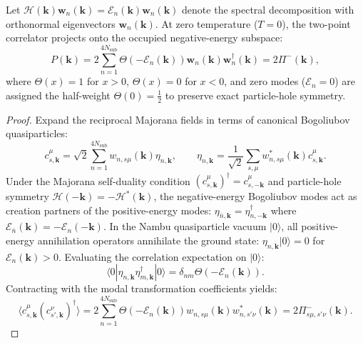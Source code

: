 \begin{theorem}
\label{thm:m1_3_spectral_projector}
Let $\mathcal{H}(\mathbf{k}) \mathbf{w}_n(\mathbf{k}) = \mathcal{E}_n(\mathbf{k}) \mathbf{w}_n(\mathbf{k})$ denote the spectral decomposition with orthonormal eigenvectors $\mathbf{w}_n(\mathbf{k})$. At zero temperature ($T = 0$), the two-point correlator projects onto the occupied negative-energy subspace:
\begin{equation}
\label{eq:m1_3_P_proj}
P(\mathbf{k}) = 2 \sum_{n=1}^{4N_{\mathrm{sub}}} \Theta(-\mathcal{E}_n(\mathbf{k})) \mathbf{w}_n(\mathbf{k}) \mathbf{w}_n^\dagger(\mathbf{k}) = 2 \Pi^-(\mathbf{k}),
\end{equation}
where $\Theta(x) = 1$ for $x > 0$, $\Theta(x) = 0$ for $x < 0$, and zero modes ($\mathcal{E}_n = 0$) are assigned the half-weight $\Theta(0) = \frac{1}{2}$ to preserve exact particle-hole symmetry.
\end{theorem}
\begin{proof}
Expand the reciprocal Majorana fields in terms of canonical Bogoliubov quasiparticles:
\begin{equation}
c_{s, \mathbf{k}}^\mu = \sqrt{2} \sum_{n=1}^{4N_{\mathrm{sub}}} w_{n, s\mu}(\mathbf{k}) \eta_{n, \mathbf{k}}, \qquad \eta_{n, \mathbf{k}} = \frac{1}{\sqrt{2}} \sum_{s, \mu} w_{n, s\mu}^*(\mathbf{k}) c_{s, \mathbf{k}}^\mu.
\end{equation}
Under the Majorana self-duality condition $(c_{s, \mathbf{k}}^\mu)^\dagger = c_{s, -\mathbf{k}}^\mu$ and particle-hole symmetry $\mathcal{H}(-\mathbf{k}) = -\mathcal{H}^*(\mathbf{k})$, the negative-energy Bogoliubov modes act as creation partners of the positive-energy modes: $\eta_{\bar{n}, \mathbf{k}} = \eta_{n, -\mathbf{k}}^\dagger$ where $\mathcal{E}_{\bar{n}}(\mathbf{k}) = -\mathcal{E}_n(-\mathbf{k})$. In the Nambu quasiparticle vacuum $|0\rangle$, all positive-energy annihilation operators annihilate the ground state: $\eta_{n, \mathbf{k}}|0\rangle = 0$ for $\mathcal{E}_n(\mathbf{k}) > 0$. Evaluating the correlation expectation on $|0\rangle$:
\begin{equation}
\langle 0 | \eta_{n, \mathbf{k}} \eta_{m, \mathbf{k}}^\dagger | 0 \rangle = \delta_{nm} \Theta(-\mathcal{E}_n(\mathbf{k})).
\end{equation}
Contracting with the modal transformation coefficients yields:
\begin{equation}
\langle c_{s, \mathbf{k}}^\mu (c_{s', \mathbf{k}}^\nu)^\dagger \rangle = 2 \sum_{n=1}^{4N_{\mathrm{sub}}} \Theta(-\mathcal{E}_n(\mathbf{k})) w_{n, s\mu}(\mathbf{k}) w_{n, s'\nu}^*(\mathbf{k}) = 2 \Pi_{s\mu, s'\nu}^-(\mathbf{k}).
\end{equation}
\end{proof}

